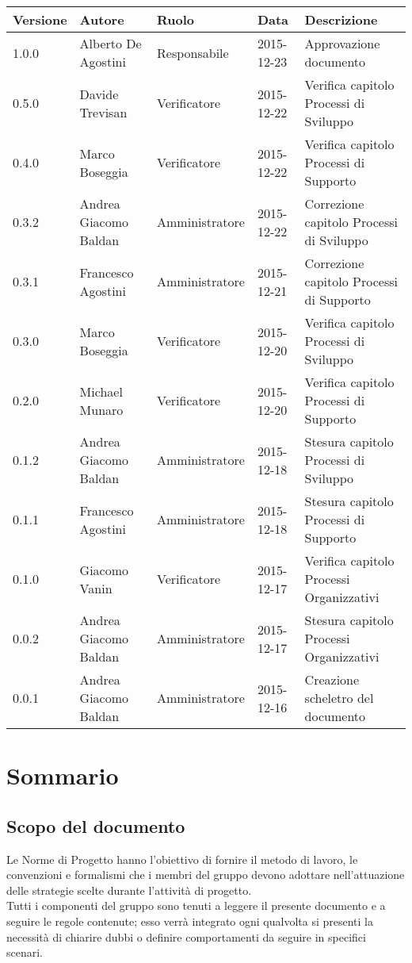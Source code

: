 \documentclass{scalatekids-article}
\begin{document}
\begin{center}
  \begin{tabular}{| l | l | l | l | l |}
    \hline
    Versione & Autore & Ruolo & Data & Descrizione \\
    \hline
    1.0.0 & Alberto De Agostini & Responsabile & 2015-12-23 & Approvazione documento\\
    \hline
    0.5.0 & Davide Trevisan & Verificatore & 2015-12-22 & Verifica capitolo Processi di Sviluppo\\
    \hline
    0.4.0 & Marco Boseggia & Verificatore & 2015-12-22 & Verifica capitolo Processi di Supporto\\
    \hline
    0.3.2 & Andrea Giacomo Baldan & Amministratore & 2015-12-22 & Correzione capitolo Processi di Sviluppo\\
    \hline
    0.3.1 & Francesco Agostini & Amministratore & 2015-12-21 & Correzione capitolo Processi di Supporto\\
    \hline
    0.3.0 & Marco Boseggia & Verificatore & 2015-12-20 & Verifica capitolo Processi di Sviluppo\\
    \hline
    0.2.0 & Michael Munaro & Verificatore & 2015-12-20 & Verifica capitolo Processi di Supporto\\
    \hline
    0.1.2 & Andrea Giacomo Baldan & Amministratore & 2015-12-18 & Stesura capitolo Processi di Sviluppo\\
    \hline
    0.1.1 & Francesco Agostini & Amministratore & 2015-12-18 & Stesura capitolo Processi di Supporto\\
    \hline
    0.1.0 & Giacomo Vanin & Verificatore & 2015-12-17 & Verifica capitolo Processi Organizzativi\\
    \hline
    0.0.2 & Andrea Giacomo Baldan & Amministratore & 2015-12-17 & Stesura capitolo Processi Organizzativi\\
    \hline
    0.0.1 & Andrea Giacomo Baldan & Amministratore & 2015-12-16 & Creazione scheletro del documento\\
    \hline
  \end{tabular}
\end{center}
\tableofcontents
\listoffigures
\section{Sommario}
\subsection{Scopo del documento}
Le Norme di Progetto hanno l'obiettivo di fornire il metodo di lavoro, le
convenzioni e formalismi che i membri del gruppo devono adottare nell'attuazione
delle strategie scelte durante l'attività di progetto. \\
Tutti i componenti del gruppo sono tenuti a leggere il presente documento e a seguire
le regole contenute; esso verrà integrato ogni qualvolta si presenti la necessità di
chiarire dubbi o definire comportamenti da seguire in specifici scenari.
\prodPurpose \glossExpl
\end{document}
